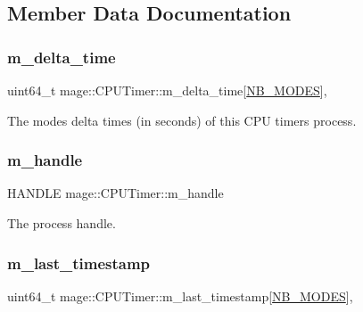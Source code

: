 \subsection{Member Data Documentation}
\hypertarget{classmage_1_1_c_p_u_timer_a7b7710e7f3b165283fad15eb0c93b96a}{}\label{classmage_1_1_c_p_u_timer_a7b7710e7f3b165283fad15eb0c93b96a} 
\subsubsection{\texorpdfstring{m\+\_\+delta\+\_\+time}{m\_delta\_time}}
{\footnotesize\ttfamily uint64\+\_\+t mage\+::\+C\+P\+U\+Timer\+::m\+\_\+delta\+\_\+time\mbox{[}\hyperlink{classmage_1_1_c_p_u_timer_a5adc0497956723a35534dfeb66fa7789ab63e6023ec0bea89568ebb2b98728b77}{N\+B\+\_\+\+M\+O\+D\+ES}\mbox{]}\hspace{0.3cm}{\ttfamily [mutable]}, {\ttfamily [private]}}

The modes\textquotesingle{} delta times (in seconds) of this C\+PU timer\textquotesingle{}s process. \hypertarget{classmage_1_1_c_p_u_timer_a95b8ac18c050ed25293c8a923087369a}{}\label{classmage_1_1_c_p_u_timer_a95b8ac18c050ed25293c8a923087369a} 
\subsubsection{\texorpdfstring{m\+\_\+handle}{m\_handle}}
{\footnotesize\ttfamily H\+A\+N\+D\+LE mage\+::\+C\+P\+U\+Timer\+::m\+\_\+handle\hspace{0.3cm}{\ttfamily [private]}}

The process handle. \hypertarget{classmage_1_1_c_p_u_timer_a6ff1dc5a56461359a699ba8b17d636a8}{}\label{classmage_1_1_c_p_u_timer_a6ff1dc5a56461359a699ba8b17d636a8} 
\subsubsection{\texorpdfstring{m\+\_\+last\+\_\+timestamp}{m\_last\_timestamp}}
{\footnotesize\ttfamily uint64\+\_\+t mage\+::\+C\+P\+U\+Timer\+::m\+\_\+last\+\_\+timestamp\mbox{[}\hyperlink{classmage_1_1_c_p_u_timer_a5adc0497956723a35534dfeb66fa7789ab63e6023ec0bea89568ebb2b98728b77}{N\+B\+\_\+\+M\+O\+D\+ES}\mbox{]}\hspace{0.3cm}{\ttfamily [mutable]}, {\ttfamily [private]}}

